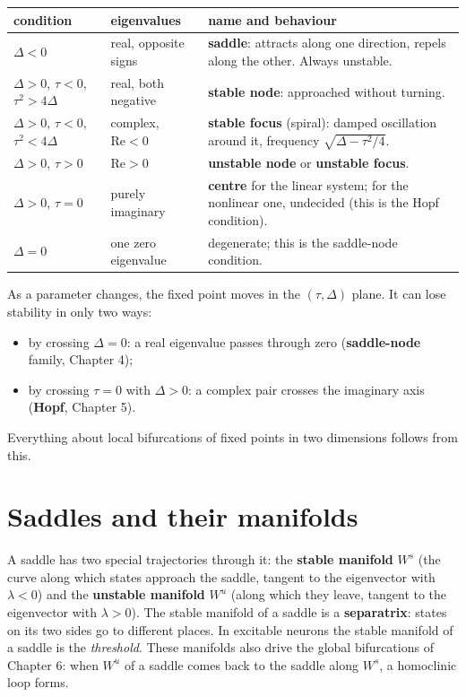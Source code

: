 \documentclass[11pt,openany]{report}
\begin{document}
\begin{center}\small
\begin{tabular}{>{\raggedright}p{3.1cm}>{\raggedright}p{3.6cm}p{7.2cm}}
\toprule
condition & eigenvalues & name and behaviour \\
\midrule
$\Delta < 0$ & real, opposite signs & \textbf{saddle}: attracts along one direction, repels along the other. Always unstable.\\
$\Delta>0$, $\tau<0$, $\tau^2>4\Delta$ & real, both negative & \textbf{stable node}: approached without turning. \\
$\Delta>0$, $\tau<0$, $\tau^2<4\Delta$ & complex, $\mathrm{Re}<0$ & \textbf{stable focus} (spiral): damped oscillation around it, frequency $\sqrt{\Delta - \tau^2/4}$. \\
$\Delta>0$, $\tau>0$ & $\mathrm{Re}>0$ & \textbf{unstable node} or \textbf{unstable focus}. \\
$\Delta>0$, $\tau=0$ & purely imaginary & \textbf{centre} for the linear system; for the nonlinear one, undecided (this is the Hopf condition). \\
$\Delta = 0$ & one zero eigenvalue & degenerate; this is the saddle-node condition. \\
\bottomrule
\end{tabular}
\end{center}

\begin{keyidea}
As a parameter changes, the fixed point moves in the $(\tau,\Delta)$ plane. It can lose stability in only two ways:
\begin{itemize}
\item by crossing $\Delta = 0$: a real eigenvalue passes through zero (\textbf{saddle-node} family, Chapter 4);
\item by crossing $\tau = 0$ with $\Delta>0$: a complex pair crosses the imaginary axis (\textbf{Hopf}, Chapter 5).
\end{itemize}
Everything about local bifurcations of fixed points in two dimensions follows from this.
\end{keyidea}

\section{Saddles and their manifolds}
A saddle has two special trajectories through it: the \textbf{stable manifold} $W^s$ (the curve along which states
approach the saddle, tangent to the eigenvector with $\lambda<0$) and the \textbf{unstable manifold} $W^u$ (along which
they leave, tangent to the eigenvector with $\lambda>0$). The stable manifold of a saddle is a \textbf{separatrix}:
states on its two sides go to different places. In excitable neurons the stable manifold of a saddle is the
\emph{threshold}. These manifolds also drive the global bifurcations of Chapter 6: when $W^u$ of a saddle comes back to
the saddle along $W^s$, a homoclinic loop forms.
\end{document}
